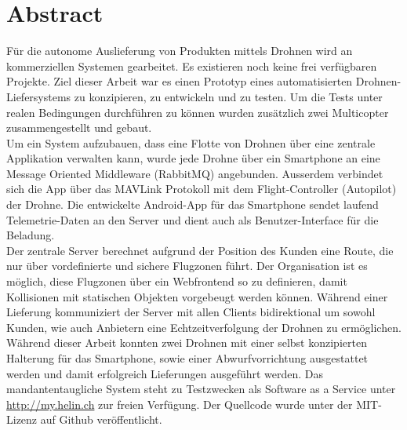 \newpage
{}
\chapter*{Abstract}

Für die autonome Auslieferung von Produkten mittels Drohnen wird an kommerziellen Systemen gearbeitet. 
Es existieren noch keine frei verfügbaren Projekte. 
Ziel dieser Arbeit war es einen Prototyp eines automatisierten Drohnen-Liefersystems zu konzipieren, zu entwickeln und zu testen. 
Um die Tests unter realen Bedingungen durchführen zu können wurden zusätzlich zwei Multicopter zusammengestellt und gebaut.\\

Um ein System aufzubauen, dass eine Flotte von Drohnen über eine zentrale Applikation verwalten kann, wurde jede Drohne über ein Smartphone an eine Message Oriented Middleware (RabbitMQ) angebunden. 
Ausserdem verbindet sich die App über das \Gls{MAVLink} Protokoll mit dem \Gls{Flight-Controller} (Autopilot) der Drohne. 
Die entwickelte Android-App für das Smartphone sendet laufend Telemetrie-Daten an den Server und dient auch als Benutzer-Interface für die Beladung. \\

Der zentrale Server berechnet aufgrund der Position des Kunden eine Route, die nur über vordefinierte und sichere Flugzonen führt. Der Organisation ist es möglich, diese Flugzonen über ein Webfrontend so zu definieren, damit Kollisionen mit statischen Objekten vorgebeugt werden können. 
Während einer Lieferung kommuniziert der Server mit allen Clients bidirektional um sowohl Kunden, wie auch Anbietern eine Echtzeitverfolgung der Drohnen zu ermöglichen. \\

Während dieser Arbeit konnten zwei Drohnen mit einer selbst konzipierten Halterung für das Smartphone, sowie einer Abwurfvorrichtung ausgestattet werden und damit erfolgreich Lieferungen ausgeführt werden. Das mandantentaugliche System steht zu Testzwecken als Software as a Service unter \url{http://my.helin.ch} zur freien Verfügung. Der Quellcode wurde unter der MIT-Lizenz auf Github veröffentlicht.

